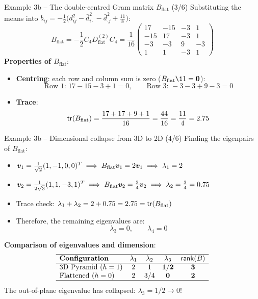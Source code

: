\documentclass[aspectratio=169]{beamer}\usepackage[]{graphicx}\usepackage[]{xcolor}
\begin{document}
\begin{frame}{Example 3b -- The double-centred Gram matrix $B_{\text{flat}}$ (3/6)}
Substituting the means into $b_{ij} = -\frac{1}{2}\big(d_{ij}^2 - \bar{d}_{i\cdot}^2 - \bar{d}_{\cdot j}^2 + \frac{11}{8}\big)$:
\[
B_{\text{flat}} = -\frac{1}{2} C_4 D^{(2)}_{\text{flat}} C_4 = \frac{1}{16}\begin{pmatrix}
17 & -15 & -3 & 1 \\
-15 & 17 & -3 & 1 \\
-3 & -3 & 9 & -3 \\
1 & 1 & -3 & 1
\end{pmatrix}
\]
\vfill
\textbf{Properties of $B_{\text{flat}}$}:
\begin{itemize}
\item \textbf{Centring}: each row and column sum is zero ($B_{\text{flat}}\11 = \b0$):
\[
\text{Row 1: } 17 - 15 - 3 + 1 = 0, \qquad \text{Row 3: } -3 - 3 + 9 - 3 = 0
\]
\item \textbf{Trace}:
\[
\mathsf{tr}(B_{\text{flat}}) = \frac{17 + 17 + 9 + 1}{16} = \frac{44}{16} = \frac{11}{4} = 2.75
\]
\end{itemize}
\end{frame}

\begin{frame}{Example 3b -- Dimensional collapse from 3D to 2D (4/6)}
Finding the eigenpairs of $B_{\text{flat}}$:
\vfill
\begin{itemize}
\item $\bm{v}_1 = \frac{1}{\sqrt{2}}(1, -1, 0, 0)^T \implies B_{\text{flat}}\bm{v}_1 = 2\bm{v}_1 \implies \lambda_1 = 2$
\item $\bm{v}_2 = \frac{1}{2\sqrt{3}}(1, 1, -3, 1)^T \implies B_{\text{flat}}\bm{v}_2 = \frac{3}{4}\bm{v}_2 \implies \lambda_2 = \frac{3}{4} = 0.75$
\item Trace check: $\lambda_1 + \lambda_2 = 2 + 0.75 = 2.75 = \mathsf{tr}(B_{\text{flat}})$
\item Therefore, the remaining eigenvalues are:
\[
\lambda_3 = 0, \qquad \lambda_4 = 0
\]
\end{itemize}
\vfill
\textbf{Comparison of eigenvalues and dimension}:
\[
\begin{array}{lcccc}
\hline
\textbf{Configuration} & \lambda_1 & \lambda_2 & \lambda_3 & \mathsf{rank}(B) \\
\hline
\text{3D Pyramid ($h=1$)} & 2 & 1 & \mathbf{1/2} & \mathbf{3} \\
\text{Flattened ($h=0$)} & 2 & 3/4 & \mathbf{0} & \mathbf{2} \\
\hline
\end{array}
\]
The out-of-plane eigenvalue has collapsed: $\lambda_3 = 1/2 \longrightarrow 0$!
\end{frame}
\end{document}
